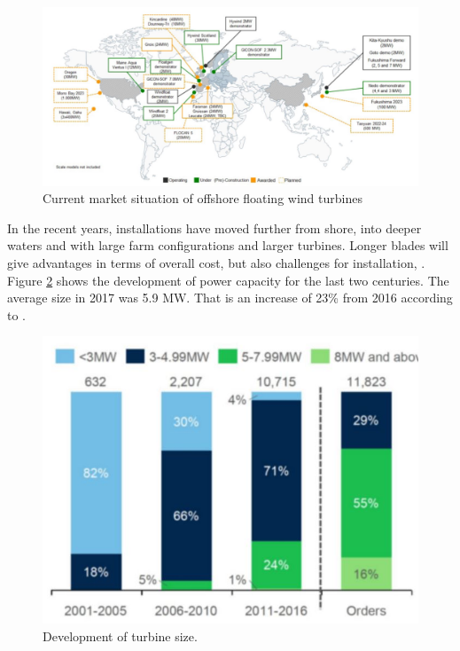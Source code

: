 \begin{figure}[H]
\centering
\includegraphics[scale=0.54]{figures/world}
\caption[$\; \:$Current market situation of offshore floating wind turbines]{Current market situation of offshore floating wind turbines \cite{Gao2018}}
 \label{fig:world}
\end{figure}

\noindent In the recent years, installations have moved further from shore, into deeper waters and with large farm configurations and larger turbines.  Longer blades will give advantages in terms of overall cost, but also challenges for installation, \cite{Gao2018}.  Figure \ref{fig:diameter} shows the development of power capacity for the last two centuries. The average size in 2017 was 5.9 MW. That is an increase of 23\% from 2016 according to \cite{we2018}.

\begin{figure}[H]
\centering
\includegraphics[scale=0.7]{figures/diameter}
\caption[$\; \:$Development of turbine size]{Development of turbine size. \cite{Deigen2018}}
 \label{fig:diameter}
\end{figure}

